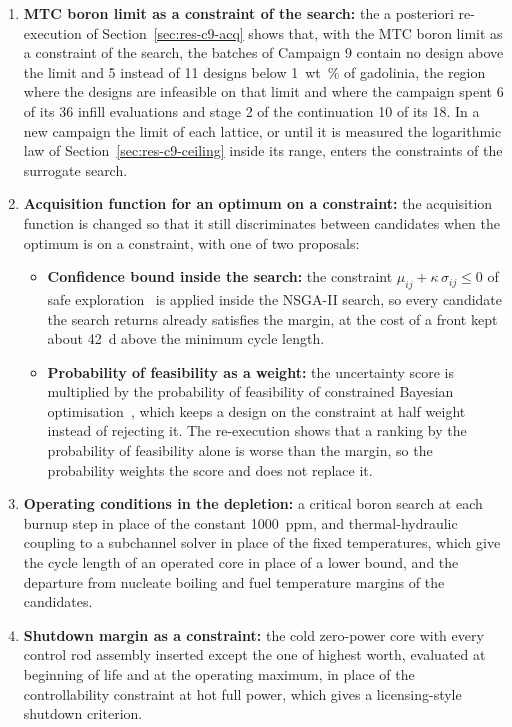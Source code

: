 \begin{enumerate}
\begin{itemize}
                them.
        \end{itemize}
        \item \textbf{MTC boron limit as a constraint of the search:} the
        a posteriori re-execution of Section~\ref{sec:res-c9-acq} shows
        that, with the MTC boron limit as a constraint of the search, the
        batches of Campaign 9 contain no design above the limit and 5
        instead of 11 designs below \SI{1}{wt\%} of gadolinia, the region
        where the designs are infeasible on that limit and where the
        campaign spent 6 of its 36 infill evaluations and stage 2 of the
        continuation 10 of its 18. In a new campaign the limit of each
        lattice, or until it is measured the logarithmic law of
        Section~\ref{sec:res-c9-ceiling} inside its range, enters the
        constraints of the surrogate search.
        \item \textbf{Acquisition function for an optimum on a constraint:}
        the acquisition function is changed so that it still
        discriminates between candidates when the optimum is on a
        constraint, with one of two proposals:
        \begin{itemize}
          \item \textbf{Confidence bound inside the search:} the
                constraint $\mu_{ij} + \kappa\,\sigma_{ij} \le 0$ of safe
                exploration~\cite{sui_safeopt_2015} is applied inside the
                NSGA-II search, so every candidate the search returns
                already satisfies the margin, at the cost of a front kept
                about \SI{42}{d} above the minimum cycle length.
          \item \textbf{Probability of feasibility as a weight:} the
                uncertainty score is multiplied by the probability of
                feasibility of constrained Bayesian
                optimisation~\cite[Sec.~5.4.2]{forrester_book_2008},
                which keeps a design on the constraint at half weight
                instead of rejecting it. The re-execution shows that a
                ranking by the probability of feasibility alone is worse
                than the margin, so the probability weights the score
                and does not replace it.
        \end{itemize}
        \item \textbf{Operating conditions in the depletion:} a critical
        boron search at each burnup step in place of the constant
        \SI{1000}{ppm}, and thermal-hydraulic coupling to a subchannel
        solver in place of the fixed temperatures, which give the cycle
        length of an operated core in place of a lower bound, and the
        departure from nucleate boiling and fuel temperature margins of
        the candidates.
    \item \textbf{Shutdown margin as a constraint:} the cold zero-power
        core with every control rod assembly inserted except the one of
        highest worth, evaluated at beginning of life and at the
        operating maximum, in place of the controllability constraint
        at hot full power, which gives a licensing-style shutdown
        criterion.
\end{enumerate}
